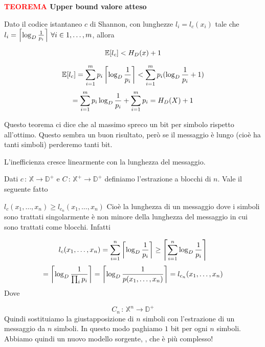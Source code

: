 \documentclass[12pt]{report}
\begin{document}
    \vspace{5px}
    \begin{tcolorbox}
        \textbf{\textcolor{red}{TEOREMA} Upper bound valore atteso}
        \vspace{5px}
        \begin{center}
            Dato il codice istantaneo $c$ di Shannon, con lunghezze $l_i = l_c(x_i)$ tale che $l_i = \left\lceil \log_D{\frac{1}{p_i}} \right\rceil \, \forall i \in 1,\dots,m$, allora

            $$\mathbb{E} [l_c] < H_D(x) + 1$$
        \end{center}
    \end{tcolorbox}

    \begin{dimo}
        $$\mathbb{E}[l_c] = \sum_{i=1}^{m} p_i \left\lceil \log_D{\frac{1}{p_i}} \right\rceil < \sum_{i=1}^{m} p_i (\log_D{\frac{1}{p_i}} + 1)$$
        $$= \sum_{i=1}^{m} p_i \log_D{\frac{1}{p_i}} + \sum_{i=1}^{m} p_i = H_D(X) + 1$$
    \end{dimo}
    \noindent
    Questo teorema ci dice che al massimo spreco un bit per simbolo rispetto all'ottimo.
    Questo sembra un buon risultato, però se il messaggio è lungo (cioè ha tanti simboli) perderemo tanti bit.

    \begin{defi}
        L'inefficienza cresce linearmente con la lunghezza del messaggio.
    \end{defi}

    \noindent
    Dati $c\, :\, \mathbb{X} \rightarrow \mathbb{D}^+$ e $C\, :\, \mathbb{X}^+ \rightarrow \mathbb{D}^+$ definiamo l'estrazione a blocchi di $n$. Vale il seguente fatto

    $l_c(x_1,\dots,x_n) \geq l_{c_n} (x_1,\dots,x_n)$
    Cioè la lunghezza di un messaggio dove i simboli sono trattati singolarmente è non minore della lunghezza del messaggio in cui sono trattati come blocchi.
    Infatti

    $$l_c(x_1,\dots,x_n) = \sum_{i=1}^{n} \left\lceil \log_D{\frac{1}{p_i}}\right\rceil \geq  \left\lceil \sum_{i=1}^{n}  \log_D{\frac{1}{p_i}} \right\rceil$$
    $$= \left\lceil \log_D{\frac{1}{\prod_i p_i}} \right\rceil  =
    \left\lceil \log_D{\frac{1}{p(x_1,\dots,x_n)}} \right\rceil  = l_{c_n} (x_1,\dots,x_n)$$
    Dove

    $$C_n \, :\, \mathbb{X}^n \rightarrow \mathbb{D}^+$$
    Quindi sostituiamo la giustapposizione di $n$ simboli con l'estrazione di un messaggio da $n$ simboli. In questo modo paghiamo $1$ bit per ogni $n$ simboli. Abbiamo quindi un nuovo modello sorgente, \nmodello, che è più complesso!
\end{document}
